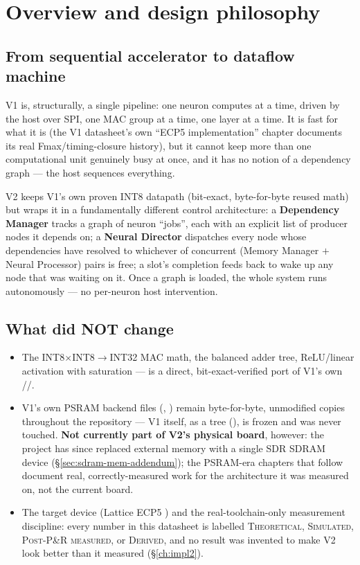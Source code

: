 \chapter{Overview and design philosophy}
\label{ch:overview}

\section{From sequential accelerator to dataflow machine}
V1 is, structurally, a single pipeline: one neuron computes at a time,
driven by the host over SPI, one MAC group at a time, one layer at a
time. It is fast for what it is (the V1 datasheet's own ``ECP5
implementation'' chapter documents its real Fmax/timing-closure history),
but it cannot keep
more than one computational unit genuinely busy at once, and it has no
notion of a dependency graph --- the host sequences everything.

V2 keeps V1's own proven INT8 datapath (bit-exact, byte-for-byte reused
math) but wraps it in a fundamentally different control architecture:
a \textbf{Dependency Manager} tracks a graph of neuron ``jobs'', each
with an explicit list of producer nodes it depends on; a \textbf{Neural
Director} dispatches every node whose dependencies have resolved to
whichever of  concurrent (Memory Manager $+$ Neural
Processor) pairs is free; a slot's completion feeds back to wake up any
node that was waiting on it. Once a graph is loaded, the whole system
runs autonomously --- no per-neuron host intervention.

\section{What did NOT change}
\begin{itemize}
\item The INT8$\times$INT8$\to$INT32 MAC math, the balanced adder tree,
      ReLU/linear activation with saturation --- 
      is a direct, bit-exact-verified port of V1's own
      //.
\item V1's own PSRAM backend files (,
      ) remain byte-for-byte, unmodified
      copies throughout the repository --- V1 itself, as a tree
      (), is frozen and was never touched.
      \textbf{Not currently part of V2's physical board}, however: the
      project has since replaced external memory with a single SDR
      SDRAM device (\S\ref{sec:sdram-mem-addendum}); the PSRAM-era
      chapters that follow document real, correctly-measured work for
      the architecture it was measured on, not the current board.
\item The target device (Lattice ECP5 ) and the
      real-toolchain-only measurement discipline: every number in this
      datasheet is labelled \textsc{Theoretical}, \textsc{Simulated},
      \textsc{Post-P\&R measured}, or \textsc{Derived}, and no result was
      invented to make V2 look better than it measured (§\ref{ch:impl2}).
\end{itemize}

